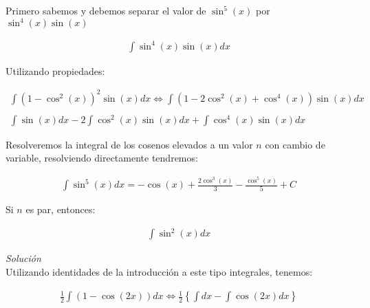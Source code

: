 Primero sabemos y debemos separar el valor de \(\displaystyle\sin^{5}(x)\) por \(\displaystyle\sin^{4}(x)\sin(x)\)

\begin{equation*}
    \begin{gathered}
        \int\sin^{4}(x)\sin(x)dx
    \end{gathered}
\end{equation*}

Utilizando propiedades:

\begin{equation*}
    \begin{gathered}
        \int(1-\cos^{2}(x))^{2}\sin(x)dx \Leftrightarrow \int(1-2\cos^{2}(x)+\cos^{4}(x))\sin(x)dx\\\\
        \int\sin(x)dx - 2\int\cos^{2}(x)\sin(x)dx + \int\cos^{4}(x)\sin(x)dx
    \end{gathered}
\end{equation*}

Resolveremos la integral de los cosenos elevados a un valor \(\displaystyle n\) con cambio de variable, resolviendo directamente tendremos:

\begin{equation*}
    \begin{gathered}
        \int \sin^{5}(x)dx=-\cos(x)+\frac{2\cos^3(x)}{3}-\frac{\cos^{5}(x)}{5}+C
    \end{gathered}
\end{equation*}

\vspace{1cm}
Si \(\displaystyle n\) es par, entonces:

\begin{equation}
    \begin{gathered}
        \int\sin^{2}(x)dx
    \end{gathered}
\end{equation}

\textit{Solución}\\

Utilizando identidades de la introducción a este tipo integrales, tenemos:

\begin{equation*}
    \begin{gathered}
        \frac{1}{2}\int(1-\cos(2x))dx \Leftrightarrow \frac{1}{2}\left\{\int dx - \int\cos(2x)dx\right\}
    \end{gathered}
\end{equation*}

